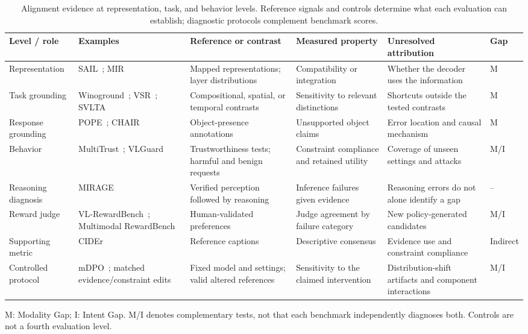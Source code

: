 \begin{table}[t]
\centering
\caption{Alignment evidence at representation, task, and behavior levels. Reference signals and controls determine what each evaluation can establish; diagnostic protocols complement benchmark scores.}
\label{tab:evaluation-summary}
\footnotesize
\setlength{\tabcolsep}{4pt}
\renewcommand{\arraystretch}{1.14}
\begin{tabularx}{\textwidth}{>{\raggedright\arraybackslash}p{}>{\raggedright\arraybackslash}p{}*{3}{>{\raggedright\arraybackslash}X}>{\centering\arraybackslash}p{}}
\toprule
\rowcolor{surveyheader}
\textbf{Level / role} & \textbf{Examples} & \textbf{Reference or contrast} & \textbf{Measured property} & \textbf{Unresolved attribution} & \textbf{Gap} \\
\midrule
Representation & SAIL~\cite{zhang2025assessing}; MIR~\cite{huang2025deciphering} & Mapped representations; layer distributions & Compatibility or integration & Whether the decoder uses the information & M \\
Task grounding & Winoground~\cite{thrush2022winoground}; VSR~\cite{liu2023visual}; SVLTA~\cite{Du2025SVLTABV} & Compositional, spatial, or temporal contrasts & Sensitivity to relevant distinctions & Shortcuts outside the tested contrasts & M \\
Response grounding & POPE~\cite{li2023evaluating}; CHAIR~\cite{rohrbach2018object} & Object-presence annotations & Unsupported object claims & Error location and causal mechanism & M \\
Behavior & MultiTrust~\cite{zhang2024multitrust}; VLGuard~\cite{zong2024vlguard} & Trustworthiness tests; harmful and benign requests & Constraint compliance and retained utility & Coverage of unseen settings and attacks & M/I \\
Reasoning diagnosis & MIRAGE~\cite{dong2026mirage} & Verified perception followed by reasoning & Inference failures given evidence & Reasoning errors do not alone identify a gap & -- \\
Reward judge & VL-RewardBench~\cite{li2025vlrewardbench}; Multimodal RewardBench~\cite{yasunaga2025multimodalrewardbench} & Human-validated preferences & Judge agreement by failure category & New policy-generated candidates & M/I \\
Supporting metric & CIDEr~\cite{vedantam2015cider} & Reference captions & Descriptive consensus & Evidence use and constraint compliance & Indirect \\
Controlled protocol & mDPO~\cite{wang2024mdpo}; matched evidence/constraint edits & Fixed model and settings; valid altered references & Sensitivity to the claimed intervention & Distribution-shift artifacts and component interactions & M/I \\
\bottomrule
\end{tabularx}
\par\smallskip
{\raggedright\footnotesize M: Modality Gap; I: Intent Gap. M/I denotes complementary tests, not that each benchmark independently diagnoses both. Controls are not a fourth evaluation level.\par}
\end{table}
